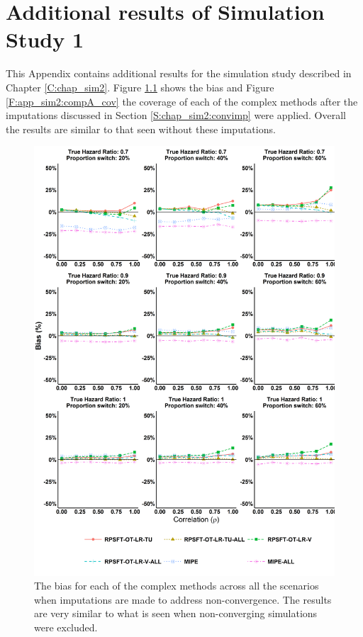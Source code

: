 \chapter{Additional results of Simulation Study 1}

\label{A:sim2res}

This Appendix contains additional results for the simulation study described in Chapter \ref{C:chap_sim2}. Figure \ref{F:app_sim2:compA_bias} shows the bias and Figure \ref{F:app_sim2:compA_cov} the coverage of each of the complex methods after the imputations discussed in Section \ref{S:chap_sim2:convimp} were applied. Overall the results are similar to that seen without these imputations. 

\begin{figure}[ht]
\centering
\includegraphics[width=14cm]{images/app_sim2res/complexA_bias.png}
\caption{\label{F:app_sim2:compA_bias} The bias for each of the complex methods across all the scenarios when imputations are made to address non-convergence. The results are very similar to what is seen when non-converging simulations were excluded.} 
\end{figure}

